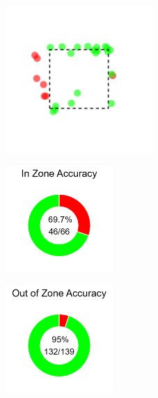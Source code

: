 \documentclass[
]{article}
\begin{document}
\begin{center}
\begin{minipage}{0.3\textwidth}
\centering
\includegraphics[height=2.2in]{plots/missed_calls.png}
\end{minipage}
\hfill
\begin{minipage}{0.3\textwidth}
\centering
\includegraphics[height=1.6in]{plots/iz_accuracy.png}
\end{minipage}
\hfill
\begin{minipage}{0.3\textwidth}
\centering
\includegraphics[height=1.6in]{plots/oz_accuracy.png}
\end{minipage}
\end{center}
\end{document}
